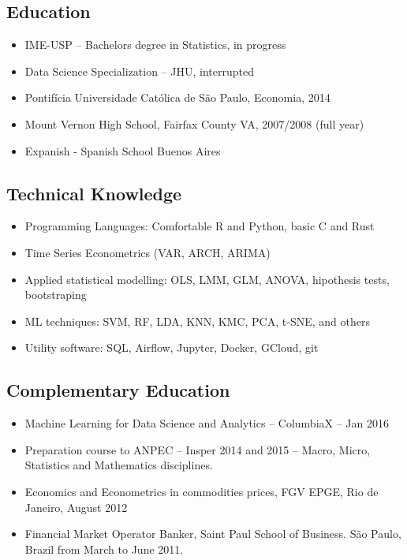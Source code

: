 \documentclass{article}
\begin{document}
{\begin{itemize}
\begin{multicols}{2}
\subsection{Education}
\begin{itemize}
\item{IME-USP – Bachelors degree in Statistics, in progress} 
\item{Data Science Specialization – JHU, interrupted} 
\item{Pontifícia Universidade Católica de São Paulo, Economia, 2014}
\item{Mount Vernon High School, Fairfax County VA, 2007/2008 (full year)}
\item{Expanish - Spanish School Buenos Aires}
\end{itemize}


\subsection{Technical Knowledge}
\begin{itemize}
\item{Programming Languages: Comfortable R and Python, basic C and Rust} 
\item{Time Series Econometrics (VAR, ARCH, ARIMA)} 
\item{Applied statistical modelling: OLS, LMM, GLM, ANOVA, hipothesis tests, bootstraping}
\item{ML techniques: SVM, RF, LDA, KNN, KMC, PCA, t-SNE, and others}
\item{Utility software: SQL, Airflow, Jupyter, Docker, GCloud, git}
\end{itemize}

\subsection{Complementary Education}
\begin{itemize}
\item{Machine Learning for Data Science and Analytics – ColumbiaX – Jan 2016} 
\item{Preparation course to ANPEC – Insper 2014 and 2015 – Macro, Micro, Statistics and Mathematics disciplines.} 
\item{Economics and Econometrics in commodities prices, FGV EPGE, Rio de Janeiro, August 2012} 
\item{Financial Market Operator Banker, Saint Paul School of Business. São Paulo, Brazil from March to June 2011.}
\end{itemize}


\end{multicols}
\end{itemize}}
\end{document}

